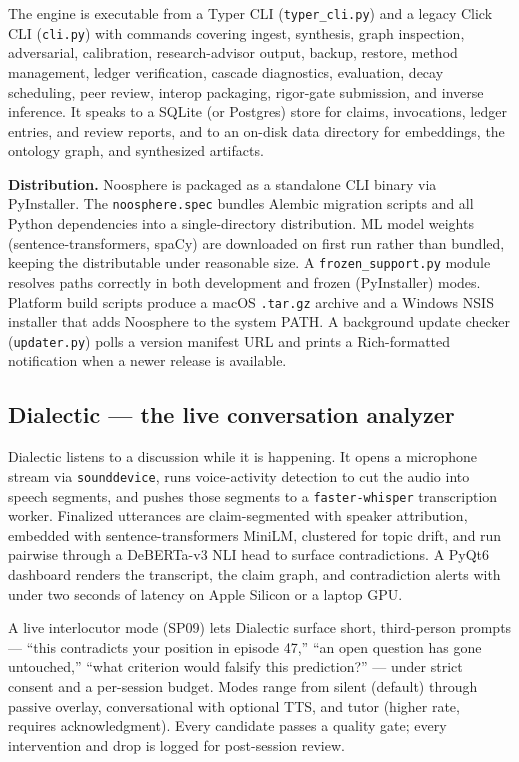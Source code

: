 \documentclass[11pt,letterpaper]{article}
\newcommand{\file}[1]{\texttt{#1}}
\begin{document}
The engine is executable from a Typer CLI (\file{typer\_cli.py}) and a legacy Click CLI (\file{cli.py}) with commands covering ingest, synthesis, graph inspection, adversarial, calibration, research-advisor output, backup, restore, method management, ledger verification, cascade diagnostics, evaluation, decay scheduling, peer review, interop packaging, rigor-gate submission, and inverse inference. It speaks to a SQLite (or Postgres) store for claims, invocations, ledger entries, and review reports, and to an on-disk data directory for embeddings, the ontology graph, and synthesized artifacts.

\textbf{Distribution.} Noosphere is packaged as a standalone CLI binary via PyInstaller. The \file{noosphere.spec} bundles Alembic migration scripts and all Python dependencies into a single-directory distribution. ML model weights (sentence-transformers, spaCy) are downloaded on first run rather than bundled, keeping the distributable under reasonable size. A \file{frozen\_support.py} module resolves paths correctly in both development and frozen (PyInstaller) modes. Platform build scripts produce a macOS \texttt{.tar.gz} archive and a Windows NSIS installer that adds Noosphere to the system PATH. A background update checker (\file{updater.py}) polls a version manifest URL and prints a Rich-formatted notification when a newer release is available.

\subsection{Dialectic --- the live conversation analyzer}

Dialectic listens to a discussion while it is happening. It opens a microphone stream via \file{sounddevice}, runs voice-activity detection to cut the audio into speech segments, and pushes those segments to a \file{faster-whisper} transcription worker. Finalized utterances are claim-segmented with speaker attribution, embedded with sentence-transformers MiniLM, clustered for topic drift, and run pairwise through a DeBERTa-v3 NLI head to surface contradictions. A PyQt6 dashboard renders the transcript, the claim graph, and contradiction alerts with under two seconds of latency on Apple Silicon or a laptop GPU.

A live interlocutor mode (SP09) lets Dialectic surface short, third-person prompts --- ``this contradicts your position in episode 47,'' ``an open question has gone untouched,'' ``what criterion would falsify this prediction?'' --- under strict consent and a per-session budget. Modes range from silent (default) through passive overlay, conversational with optional TTS, and tutor (higher rate, requires acknowledgment). Every candidate passes a quality gate; every intervention and drop is logged for post-session review.
\end{document}
